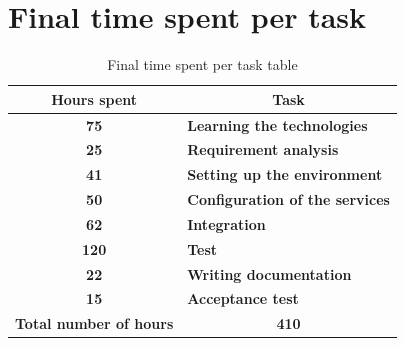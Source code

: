 \section{Final time spent per task}
	\begin{table}[H]
		\begin{tabularx}{\textwidth}{c|X}
			\centering\textbf{Hours spent} & \multicolumn{1}{c}{\textbf{Task}}\\\hline
			\textbf{75}&\textbf{Learning the technologies}\\\hline
			\textbf{25}&\textbf{Requirement analysis}\\\hline
			\textbf{41}&\textbf{Setting up the environment}\\\hline
			\textbf{50}&\textbf{Configuration of the services}\\\hline
			\textbf{62}&\textbf{Integration}\\\hline
			\textbf{120}&\textbf{Test}\\\hline
			\textbf{22}&\textbf{Writing documentation}\\\hline
			\textbf{15}&\textbf{Acceptance test}\\\hline
			\textbf{Total number of hours}&\multicolumn{1}{c}{\textbf{410}} \\	
		\end{tabularx}
		\caption{Final time spent per task table}
	\end{table}


